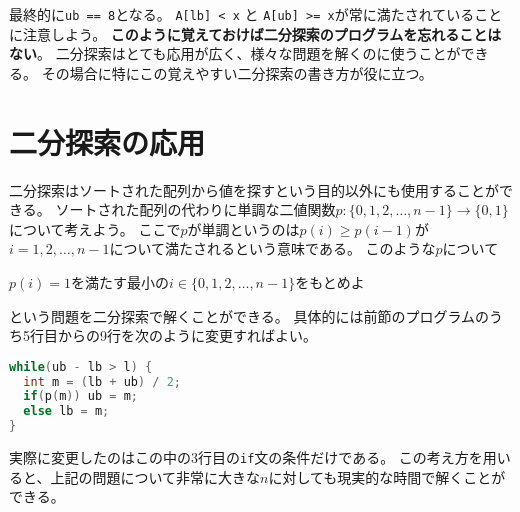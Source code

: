 \documentclass[a4paper,twoside,onecolumn,openany,article,10pt]{memoir}
\theoremstyle{remark}
\begin{document}
\begin{center}
\end{center}

最終的に\texttt{ub == 8}となる。
\texttt{A[lb] < x} と \texttt{A[ub] >= x}が常に満たされていることに注意しよう。
\textbf{このように覚えておけば二分探索のプログラムを忘れることはない}。
二分探索はとても応用が広く、様々な問題を解くのに使うことができる。
その場合に特にこの覚えやすい二分探索の書き方が役に立つ。


\section{二分探索の応用}
二分探索はソートされた配列から値を探すという目的以外にも使用することができる。
ソートされた配列の代わりに単調な二値関数$p\colon \{0,1,2,\dotsc,n-1\}\to\{0,1\}$について考えよう。
ここで$p$が単調というのは$p(i)\ge p(i-1)$が$i=1,2,\dotsc,n-1$について満たされるという意味である。
このような$p$について
\begin{center}
$p(i) = 1$を満たす最小の$i\in\{0,1,2,\dotsc,n-1\}$をもとめよ
\end{center}
という問題を二分探索で解くことができる。
具体的には前節のプログラムのうち5行目からの9行を次のように変更すればよい。
\begin{lstlisting}[basicstyle=\ttfamily\small,showstringspaces=false,language=C,frame=single]
while(ub - lb > l) {
  int m = (lb + ub) / 2;
  if(p(m)) ub = m;
  else lb = m;
}
\end{lstlisting}
実際に変更したのはこの中の3行目の\texttt{if}文の条件だけである。
この考え方を用いると、上記の問題について非常に大きな$n$に対しても現実的な時間で解くことができる。
\end{document}
